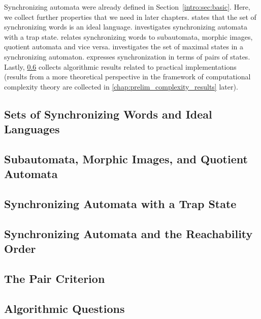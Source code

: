 
Synchronizing automata were already defined in Section~\ref{intro:sec:basic}. Here, we collect further properties
that we need in later chapters.
 states that the set of synchronizing words is an ideal language.
 investigates synchronizing automata with a trap state.
 relates synchronizing words to subautomata, morphic images,
quotient automata and vice versa.
investigates the set of maximal states in a synchronizing automaton.
 expresses synchronization in terms of pairs of states.
Lastly, \cref{prelim:sync:algorithmic} collects algorithmic results related
to practical implementations (results from a more theoretical perspective in the framework
of computational complexity theory are collected in \cref{chap:prelim_complexity_results} later).


\subsection{Sets of Synchronizing Words and Ideal Languages} 
\label{prelim:classes:sync:ideal}



\subsection{Subautomata, Morphic Images, and Quotient Automata}
\label{prelim:classes:sync:subfactor}



\subsection{Synchronizing Automata with a Trap State} 
\label{prelim:sync:trap}



\subsection{Synchronizing Automata and the Reachability Order}
\label{prelim:classes:sync:reach}



\subsection{The Pair Criterion} %
\label{prelim:sync:pair}



\subsection{Algorithmic Questions} 
\label{prelim:sync:algorithmic}




